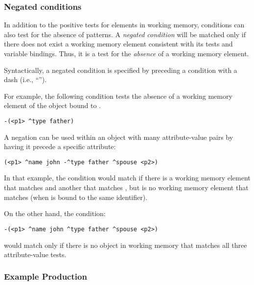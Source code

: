 \subsubsection{Negated conditions}
\label{SYNTAX-pm-lhs-negated}
\index{-}

In addition to the positive tests for elements in working memory, conditions can also test for the absence of patterns.  A \emph{negated condition} will be matched only if there does not exist a working memory element consistent with its tests and variable bindings. Thus, it is a test for the \textit{absence} of a working memory element.

Syntactically, a negated condition is specified by preceding a condition with a dash (i.e., ``\soar{-}'').

For example, the following condition tests the absence of a working memory element of the object bound to .

\begin{verbatim}
-(<p1> ^type father)
\end{verbatim} 
\vspace{12pt}

A negation can be used within an object with many attribute-value pairs by having it precede a specific attribute:

\begin{verbatim}
(<p1> ^name john -^type father ^spouse <p2>)
\end{verbatim} \vspace{12pt}

In that example, the condition would match if there is a working memory element that matches  and another that matches , but is no working memory element that matches  (when  is bound to the same identifier).

On the other hand, the condition:

\begin{verbatim}
-(<p1> ^name john ^type father ^spouse <p2>)
\end{verbatim}

would match only if there is no object in working memory that matches all three attribute-value tests.

\subsubsection*{Example Production}

